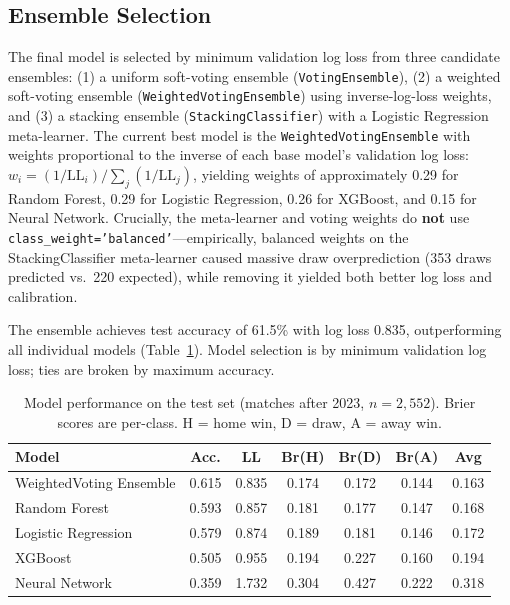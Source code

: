 \documentclass[11pt,a4paper]{article}
\begin{document}
\subsection{Ensemble Selection}
\label{sec:model:ensemble}

The final model is selected by minimum validation log loss from three candidate ensembles: (1) a uniform soft-voting ensemble (\texttt{VotingEnsemble}), (2) a weighted soft-voting ensemble (\texttt{WeightedVotingEnsemble}) using inverse-log-loss weights, and (3) a stacking ensemble (\texttt{StackingClassifier}) with a Logistic Regression meta-learner. The current best model is the \texttt{WeightedVotingEnsemble} with weights proportional to the inverse of each base model's validation log loss: $w_i = (1/\text{LL}_i) / \sum_j (1/\text{LL}_j)$, yielding weights of approximately 0.29 for Random Forest, 0.29 for Logistic Regression, 0.26 for XGBoost, and 0.15 for Neural Network. Crucially, the meta-learner and voting weights do \textbf{not} use \texttt{class\_weight='balanced'}---empirically, balanced weights on the StackingClassifier meta-learner caused massive draw overprediction (353 draws predicted vs.\ 220 expected), while removing it yielded both better log loss and calibration.

The ensemble achieves test accuracy of 61.5\% with log loss 0.835, outperforming all individual models (Table~\ref{tab:model_perf}). Model selection is by minimum validation log loss; ties are broken by maximum accuracy.

\begin{table}[t]
\centering
\caption{Model performance on the test set (matches after 2023, $n = 2{,}552$). Brier scores are per-class. H = home win, D = draw, A = away win.}
\label{tab:model_perf}
\begin{tabular}{lcccccc}
\toprule
\textbf{Model} & \textbf{Acc.} & \textbf{LL} & \textbf{Br(H)} & \textbf{Br(D)} & \textbf{Br(A)} & \textbf{Avg} \\
\midrule
WeightedVoting Ensemble & 0.615 & 0.835 & 0.174 & 0.172 & 0.144 & 0.163 \\
Random Forest        & 0.593 & 0.857 & 0.181 & 0.177 & 0.147 & 0.168 \\
Logistic Regression  & 0.579 & 0.874 & 0.189 & 0.181 & 0.146 & 0.172 \\
XGBoost              & 0.505 & 0.955 & 0.194 & 0.227 & 0.160 & 0.194 \\
Neural Network       & 0.359 & 1.732 & 0.304 & 0.427 & 0.222 & 0.318 \\
\bottomrule
\end{tabular}
\end{table}
\end{document}
